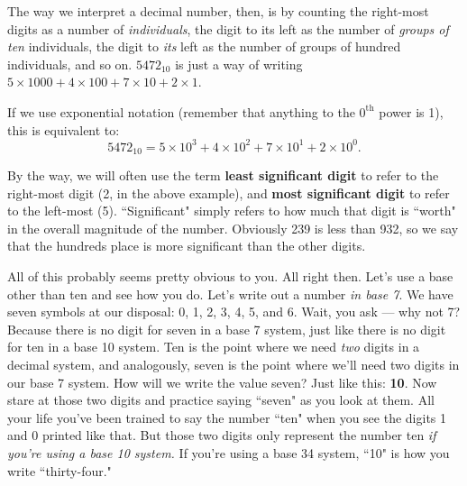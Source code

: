 The way we interpret a decimal number, then, is by counting the right-most
digits as a number of \textit{individuals}, the digit to its left as the
number of \textit{groups of ten} individuals, the digit to \textit{its}
left as the number of groups of hundred individuals, and so on. $5472_{10}$
is just a way of writing $5 \times 1000 + 4 \times 100 + 7 \times 10 + 2
\times 1$.

If we use exponential notation (remember that anything to the
$0^{\text{th}}$ power is 1), this is equivalent to:
\[
5472_{10} = 5 \times 10^3 + 4 \times 10^2 + 7 \times 10^1 + 2 \times 10^0.
\]

By the way, we will often use the term \textbf{least significant digit} to
refer to the right-most digit (2, in the above example), and \textbf{most
significant digit} to refer to the left-most (5). ``Significant" simply
refers to how much that digit is ``worth" in the overall magnitude of the
number. Obviously 239 is less than 932, so we say that the hundreds place
is more significant than the other digits.

All of this probably seems pretty obvious to you. All right then. Let's
use a base other than ten and see how you do. Let's write out a number
\textit{in base 7}. We have seven symbols at our disposal: 0, 1, 2, 3, 4,
5, and 6. Wait, you ask --- why not 7? Because there is no digit for seven
in a base 7 system, just like there is no digit for ten in a base 10
system. Ten is the point where we need \textit{two} digits in a decimal
system, and analogously, seven is the point where we'll need two digits in
our base 7 system. How will we write the value seven? Just like this:
\textbf{10}. Now stare at those two digits and practice saying ``seven" as
you look at them.  All your life you've been trained to say the number
``ten" when you see the digits 1 and 0 printed like that. But those two
digits only represent the number ten \textit{if you're using a base 10
system.} If you're using a base 34 system, ``10" is how you write
``thirty-four."

